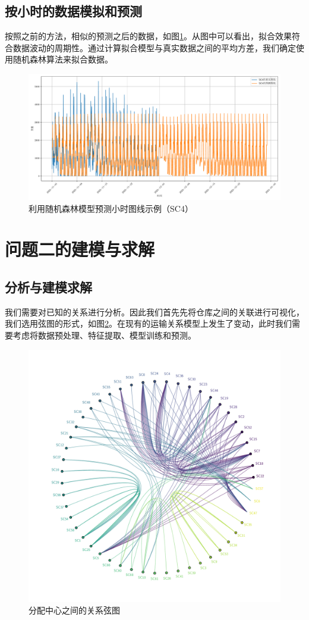 \documentclass[UTF8,a4paper,10 pt]{article}%
\begin{document}
\subsection{按小时的数据模拟和预测}
按照之前的方法，相似的预测之后的数据，如图\ref{SC4_2}。从图中可以看出，拟合效果符合数据波动的周期性。通过计算拟合模型与真实数据之间的平均方差，我们确定使用随机森林算法来拟合数据。

\begin{figure}[!ht]
	\centering
	\includegraphics*[width=0.9\linewidth]{images/SC_4_2.pdf}
	\caption{利用随机森林模型预测小时图线示例（SC4）}
	\label{SC4_2}
\end{figure}


\section{问题二的建模与求解}
\subsection{分析与建模求解}
我们需要对已知的关系进行分析。因此我们首先先将仓库之间的关联进行可视化，我们选用弦图的形式，如图\ref{xt}。在现有的运输关系模型上发生了变动，此时我们需要考虑将数据预处理、特征提取、模型训练和预测。
\begin{figure}[!t]
	\centering
	\includegraphics*[width=0.8\linewidth]{images/xuantu.pdf}
	\caption{分配中心之间的关系弦图}
	\label{xt}
\end{figure}
\end{document}
